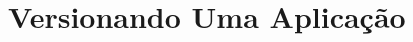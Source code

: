 \documentclass[t, 				             
			   final,
			   12pt, 				         
			   xcolor={usenames,dvipsnames}, 
			   table]{beamer}
\begin{document}
	
	
	  	
    
    \section{Versionando Uma Aplicação}
    
        
    
\end{document}
